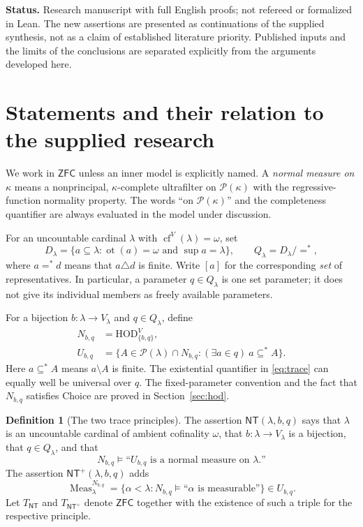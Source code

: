 \documentclass[11pt,letterpaper]{article}
\theoremstyle{definition}
\newtheorem{definition}{Definition}[section]
\numberwithin{equation}{section}
\newcommand{\ZFC}{\mathsf{ZFC}}
\newcommand{\HOD}{\mathrm{HOD}}
\newcommand{\cf}{\operatorname{cf}}
\newcommand{\ot}{\operatorname{ot}}
\newcommand{\Pow}{\mathcal P}
\newcommand{\Meas}{\operatorname{Meas}}
\newcommand{\NT}{\mathsf{NT}}
\newcommand{\NTP}{\mathsf{NT}^{+}}
\begin{document}
\textbf{Status.} Research manuscript with full English proofs; not
refereed or formalized in Lean. The new assertions are presented as
continuations of the supplied synthesis, not as a claim of established
literature priority. Published inputs and the limits of the conclusions
are separated explicitly from the arguments developed here.

\newpage
\tableofcontents
\newpage

\section{Statements and their relation to the supplied research}\label{sec:results}

We work in $\ZFC$ unless an inner model is explicitly named. A \emph{normal
measure on $\kappa$} means a nonprincipal, $\kappa$-complete ultrafilter on
$\Pow(\kappa)$ with the regressive-function normality property. The words
``on $\Pow(\kappa)$'' and the completeness quantifier are always evaluated
in the model under discussion.

For an uncountable cardinal $\lambda$ with $\cf^V(\lambda)=\omega$, set
\[
 D_\lambda=\{a\subseteq\lambda:\ot(a)=\omega\text{ and }\sup a=\lambda\},
 \qquad Q_\lambda=D_\lambda/{=^*},
\]
where $a=^*d$ means that $a\triangle d$ is finite. Write $[a]$ for the
corresponding \emph{set} of representatives. In particular, a parameter
$q\in Q_\lambda$ is one set parameter; it does not give its individual
members as freely available parameters.

For a bijection $b:\lambda\to V_\lambda$ and $q\in Q_\lambda$, define
\begin{align}
 N_{b,q}&=\HOD_{\{b,q\}}^V,\label{eq:N}\\
 U_{b,q}&=\{A\in\Pow(\lambda)\cap N_{b,q}:
                  (\exists a\in q)\ a\subseteq^* A\}.
                  \label{eq:trace}
\end{align}
Here $a\subseteq^* A$ means $a\setminus A$ is finite. The existential
quantifier in \eqref{eq:trace} can equally well be universal over $q$.
The fixed-parameter convention and the fact that $N_{b,q}$ satisfies
Choice are proved in Section~\ref{sec:hod}.

\begin{definition}[The two trace principles]\label{def:NT}
The assertion $\NT(\lambda,b,q)$ says that $\lambda$ is an uncountable
cardinal of ambient cofinality $\omega$, that $b:\lambda\to V_\lambda$ is
a bijection, that $q\in Q_\lambda$, and that
\[
 N_{b,q}\models\text{``$U_{b,q}$ is a normal measure on $\lambda$.''}
\]
The assertion $\NTP(\lambda,b,q)$ adds
\[
 \Meas_\lambda^{N_{b,q}}
 =\{\alpha<\lambda:N_{b,q}\models\text{``$\alpha$ is measurable''}\}
 \in U_{b,q}.
\]
Let $T_{\NT}$ and $T_{\NTP}$ denote $\ZFC$ together with the existence of
such a triple for the respective principle.
\end{definition}
\end{document}
